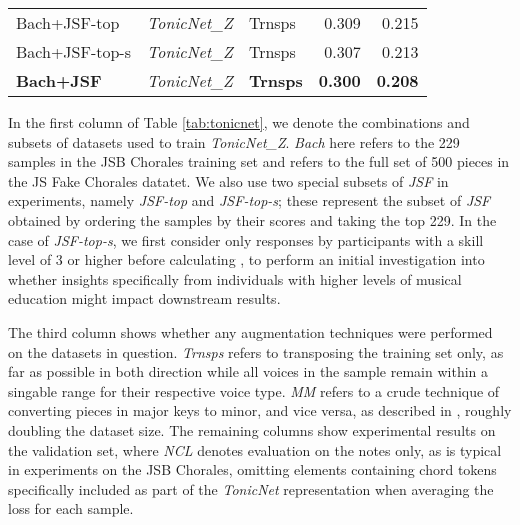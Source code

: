 \documentclass{article}
\begin{document}
\begin{table}
\begin{tabular}{lllrr}
Bach+JSF-top            & \textit{TonicNet\_Z }       & Trnsps          & 0.309                                 & 0.215                                      \\
Bach+JSF-top-s          & \textit{TonicNet\_Z }       & Trnsps          & 0.307                                 & 0.213                                      \\
\textbf{Bach+JSF}       & \textit{TonicNet\_Z }       & \textbf{Trnsps} & \textbf{0.300}                        & \textbf{0.208}                            
\end{tabular}
\end{table}

In the first column of Table \ref{tab:tonicnet}, we denote the combinations and subsets of datasets used to train \textit{TonicNet\_Z}. \textit{Bach} here refers to the 229 samples in the JSB Chorales training set and  refers to the full set of 500 pieces in the JS Fake Chorales datatet. We also use two special subsets of \textit{JSF} in experiments, namely \textit{JSF-top} and \textit{JSF-top-s}; these represent the subset of \textit{JSF} obtained by ordering the samples by their  scores and taking the top 229. In the case of \textit{JSF-top-s}, we first consider only responses by participants with a skill level of 3 or higher before calculating , to perform an initial investigation into whether insights specifically from individuals with higher levels of musical education might impact downstream results.

The third column shows whether any augmentation techniques were performed on the datasets in question. \textit{Trnsps} refers to transposing the training set only, as far as possible in both direction while all voices in the sample remain within a singable range for their respective voice type. \textit{MM} refers to a crude technique of converting pieces in major keys to minor, and vice versa, as described in \cite{tonicnet}, roughly doubling the dataset size. The remaining columns show experimental results on the validation set, where \textit{NCL} denotes evaluation on the notes only, as is typical in experiments on the JSB Chorales, omitting elements containing chord tokens specifically included as part of the \textit{TonicNet} representation when averaging the loss for each sample.
\end{document}
